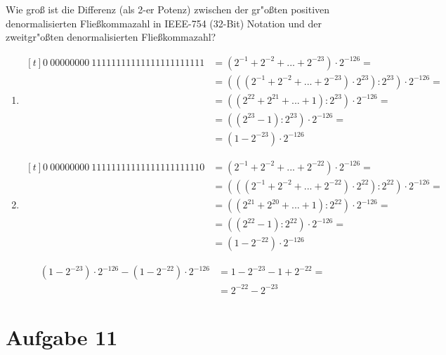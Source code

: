 \documentclass[10pt, oneside]{article}
\begin{document}
Wie gro{\ss} ist die Differenz (als 2-er Potenz) zwischen der gr"o{\ss}ten
positiven denormalisierten Flie{\ss}kommazahl in IEEE-754 (32-Bit) Notation und
der zweitgr"o{\ss}ten denormalisierten Flie{\ss}kommazahl?
\begin{enumerate}
    \item $\begin{aligned}[t]
            0\ 00000000\ 11111111111111111111111 &= (2^{-1} + 2^{-2} + ... + 2^{-23}) \cdot 2^{-126} = \\
                                                 &= (((2^{-1} + 2^{-2} + ... + 2^{-23}) \cdot 2^{23}) : 2^{23}) \cdot 2^{-126} = \\
                                                 &= ((2^{22} + 2^{21} + ... + 1) : 2^{23}) \cdot 2^{-126} = \\
                                                 &= ((2^23 - 1) : 2^{23}) \cdot 2^{-126} = \\
                                                 &= (1 - 2^{-23}) \cdot 2^{-126}
        \end{aligned}$
    \item $\begin{aligned}[t]
            0\ 00000000\ 11111111111111111111110 &= (2^{-1} + 2^{-2} + ... + 2^{-22}) \cdot 2^{-126} = \\
                                                 &= (((2^{-1} + 2^{-2} + ... + 2^{-22}) \cdot 2^{22}) : 2^{22}) \cdot 2^{-126} = \\
                                                 &= ((2^{21} + 2^{20} + ... + 1) : 2^{22}) \cdot 2^{-126} = \\
                                                 &= ((2^22 - 1) : 2^{22}) \cdot 2^{-126} = \\
                                                 &= (1 - 2^{-22}) \cdot 2^{-126}
        \end{aligned}$
\end{enumerate}
\begin{align*}
    (1 - 2^{-23}) \cdot 2^{-126} - (1 - 2^{-22}) \cdot 2^{-126} &= 1 - 2^{-23} - 1 + 2^{-22} = \\
                                                                &= 2^{-22} - 2^{-23}
\end{align*}

\section{Aufgabe 11}
\end{document}
